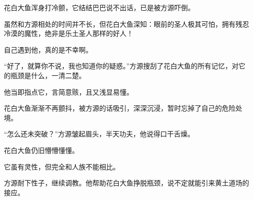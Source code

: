 \begin{this_body}
花白大鱼浑身打冷颤，它结结巴巴说不出话，已是被方源吓倒。

虽然和方源相处的时间并不长，但花白大鱼深知：眼前的圣人极其可怕，拥有残忍冷漠的魔性，绝非是乐土圣人那样的好人！

自己遇到他，真的是不幸啊。

“好了，就算你不说，我也知道你的疑惑。”方源搜刮了花白大鱼的所有记忆，对它的瓶颈是什么，一清二楚。

他当即指点它，言简意赅，且又浅显易懂。

花白大鱼渐渐不再颤抖，被方源的话吸引，深深沉浸，暂时忘掉了自己的危险处境。

“怎么还未突破？”方源皱起眉头，半天功夫，他说得口干舌燥。

花白大鱼仍旧懵懵懂懂。

它虽有灵性，但完全和人族不能相比。

方源耐下性子，继续调教。他帮助花白大鱼挣脱瓶颈，说不定就能引来黄土道场的接应。

\end{this_body}


